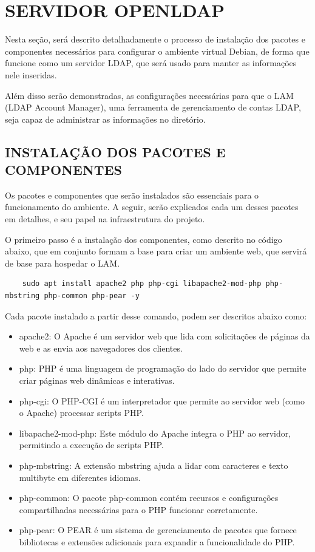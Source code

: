 \section{SERVIDOR OPENLDAP}

Nesta seção, será descrito detalhadamente o processo de instalação dos pacotes e componentes necessários para configurar o ambiente virtual Debian, de forma que funcione como um servidor LDAP, que será usado para manter as informações nele inseridas. 

Além disso serão demonstradas, as configurações necessárias para que o LAM (LDAP Account Manager), uma ferramenta de gerenciamento de contas LDAP, seja capaz de administrar as informações no diretório.

\subsection{INSTALAÇÃO DOS PACOTES E COMPONENTES}

Os pacotes e componentes que serão instalados são essenciais para o funcionamento do ambiente. A seguir, serão explicados cada um desses pacotes em detalhes, e seu papel na infraestrutura do projeto.

O primeiro passo é a instalação dos componentes, como descrito no código abaixo, que em conjunto formam a base para criar um ambiente web, que servirá de base para hospedar o LAM.

\begin{lstlisting}
    sudo apt install apache2 php php-cgi libapache2-mod-php php-mbstring php-common php-pear -y
\end{lstlisting}

Cada pacote instalado a partir desse comando, podem ser descritos abaixo como:

\begin{itemize}
    \item apache2: O Apache é um servidor web que lida com solicitações de páginas da web e as envia aos navegadores dos clientes.
    \item php: PHP é uma linguagem de programação do lado do servidor que permite criar páginas web dinâmicas e interativas.
    \item php-cgi: O PHP-CGI é um interpretador que permite ao servidor web (como o Apache) processar scripts PHP.
    \item libapache2-mod-php: Este módulo do Apache integra o PHP ao servidor, permitindo a execução de scripts PHP.
    \item php-mbstring: A extensão mbstring ajuda a lidar com caracteres e texto multibyte em diferentes idiomas.
    \item php-common: O pacote php-common contém recursos e configurações compartilhadas necessárias para o PHP funcionar corretamente.
    \item php-pear: O PEAR é um sistema de gerenciamento de pacotes que fornece bibliotecas e extensões adicionais para expandir a funcionalidade do PHP.
\end{itemize}

